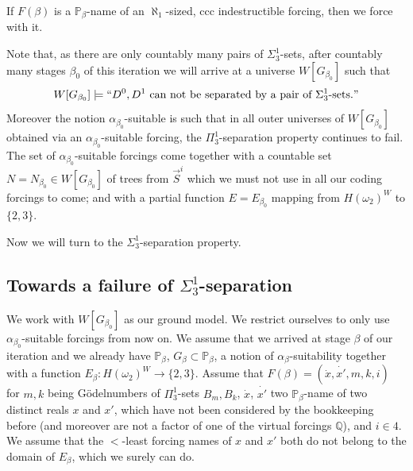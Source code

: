 \documentclass[a4paper,11pt]{article}
\newcommand{\forceP}{\mathbb{P}}
\newcommand{\forceQ}{\mathbb{Q}}
\begin{document}
{If $F(\beta)$ is a $\forceP_{\beta}$-name of an $\aleph_1$-sized, ccc indestructible forcing, then we force with it.

Note that, as there are only countably many pairs of $\Sigma^1_3$-sets, after countably many stages $\beta_0$ of this iteration we will arrive at a universe $W[G_{\beta_0}]$ such that 
\[ W[G_{\beta_0}] \models ``D^0,D^1 \text{ can not be separated by a pair of $\Sigma^1_3$-sets.$"$} \]
Moreover the notion $\alpha_{\beta_0}$-suitable is such that in all outer universes of $W[G_{\beta_0}]$ obtained via an $\alpha_{\beta_0}$-suitable forcing, the $\Pi^1_3$-separation property continues to fail. The set of $\alpha_{\beta_0}$-suitable forcings come together with a countable set $N = N_{\beta_0} \in W[G_{\beta_0}]$ of trees from $\vec{S}^i$ which we must not use in all our coding forcings to come; and with a 
partial function $E=E_{\beta_0}$ mapping from $H(\omega_2)^W$ to $\{2,3\}$.

Now we will turn to the $\Sigma^1_3$-separation property.

\subsection{Towards a failure of $\Sigma^1_3$-separation}
We work with $W[G_{\beta_0}]$ as our ground model. We restrict ourselves to only use $\alpha_{\beta_0}$-suitable forcings from now on.
We assume that we arrived at stage $\beta$ of our iteration and we already have
$\forceP_{\beta}$, $G_{\beta} \subset \forceP_{\beta}$, a notion of $\alpha_{\beta}$-suitability together with a function $E_{\beta} : H(\omega_2)^W \rightarrow \{2,3\}$.
Assume that $F(\beta)= (\dot{x},\dot{x'}, m,k,i)$ for $m,k$ being G\"odelnumbers of $\Pi^1_3$-sets $B_m,B_k$, $\dot{x}$, $\dot{x'}$ two $\forceP_{\beta}$-name of two distinct reals $x$ and $x'$, which have not been considered by the bookkeeping before (and moreover are not a factor of one of the virtual forcings $\forceQ$), and $i \in 4$.
We assume that the $<$-least forcing names of $x$ and $x'$ both do not belong to the domain of $E_{\beta}$, which we surely can do.


}
\end{document}
